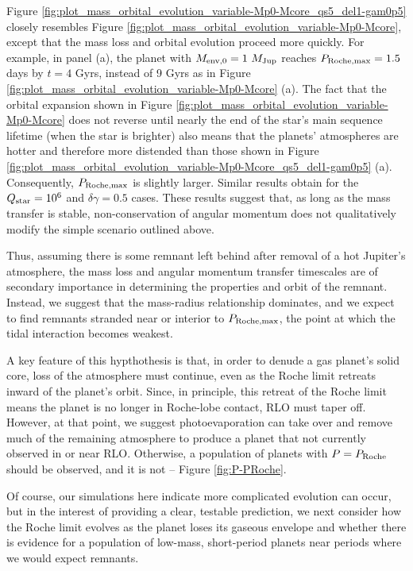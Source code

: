 \documentclass{svjour3}                     %
\begin{document}
Figure \ref{fig:plot_mass_orbital_evolution_variable-Mp0-Mcore_qs5_del1-gam0p5} closely resembles Figure \ref{fig:plot_mass_orbital_evolution_variable-Mp0-Mcore}, except that the mass loss and orbital evolution proceed more quickly. For example, in panel (a), the planet with $M_{\rm env, 0} = 1\ M_{\rm Jup}$ reaches $P_{\rm Roche, max} = 1.5$ days by $t = 4$ Gyrs, instead of 9 Gyrs as in Figure \ref{fig:plot_mass_orbital_evolution_variable-Mp0-Mcore} (a). The fact that the orbital expansion shown in Figure \ref{fig:plot_mass_orbital_evolution_variable-Mp0-Mcore} does not reverse until nearly the end of the star's main sequence lifetime (when the star is brighter) also means that the planets' atmospheres are hotter and therefore more distended than those shown in Figure \ref{fig:plot_mass_orbital_evolution_variable-Mp0-Mcore_qs5_del1-gam0p5} (a). Consequently, $P_{\rm Roche, max}$ is slightly larger. Similar results obtain for the $Q_{\rm star} = 10^6$ and $\delta \gamma = 0.5$ cases. These results suggest that, as long as the mass transfer is stable, non-conservation of angular momentum does not qualitatively modify the simple scenario outlined above. 

Thus, assuming there is some remnant left behind after removal of a hot Jupiter's atmosphere, the mass loss and angular momentum transfer timescales are of secondary importance in determining the properties and orbit of the remnant. Instead, we suggest that the mass-radius relationship dominates, and we expect to find remnants stranded near or interior to $P_{\rm Roche, max}$, the point at which the tidal interaction becomes weakest. 

A key feature of this hypthothesis is that, in order to denude a gas planet's solid core, loss of the atmosphere must continue, even as the Roche limit retreats inward of the planet's orbit. Since, in principle, this retreat of the Roche limit means the planet is no longer in Roche-lobe contact, RLO must taper off. However, at that point, we suggest photoevaporation can take over and remove much of the remaining atmosphere to produce a planet that not currently observed in or near RLO. Otherwise, a population of planets with $P = P_{\rm Roche}$ should be observed, and it is not -- Figure \ref{fig:P-PRoche}.

Of course, our simulations here indicate more complicated evolution can occur, but in the interest of providing a clear, testable prediction, we next consider how the Roche limit evolves as the planet loses its gaseous envelope and whether there is evidence for a population of low-mass, short-period planets near periods where we would expect remnants.
\end{document}
